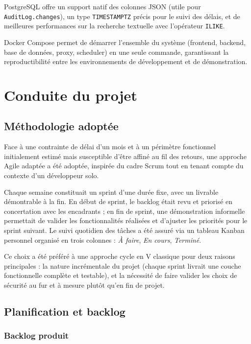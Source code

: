 PostgreSQL offre un support natif des colonnes JSON (utile pour \texttt{AuditLog.changes}), un type \texttt{TIMESTAMPTZ} précis pour le suivi des délais, et de meilleures performances sur la recherche textuelle avec l'opérateur \texttt{ILIKE}.

Docker Compose permet de démarrer l'ensemble du système (frontend, backend, base de données, proxy, scheduler) en une seule commande, garantissant la reproductibilité entre les environnements de développement et de démonstration.

\section{Conduite du projet}

\subsection{Méthodologie adoptée}

Face à une contrainte de délai d'un mois et à un périmètre fonctionnel initialement estimé mais susceptible d'être affiné au fil des retours, une approche Agile adaptée a été adoptée, inspirée du cadre Scrum tout en tenant compte du contexte d'un développeur solo.

Chaque semaine constituait un sprint d'une durée fixe, avec un livrable démontrable à la fin. En début de sprint, le backlog était revu et priorisé en concertation avec les encadrants ; en fin de sprint, une démonstration informelle permettait de valider les fonctionnalités réalisées et d'ajuster les priorités pour le sprint suivant. Le suivi quotidien des tâches a été assuré via un tableau Kanban personnel organisé en trois colonnes : \textit{À faire}, \textit{En cours}, \textit{Terminé}.

Ce choix a été préféré à une approche cycle en V classique pour deux raisons principales : la nature incrémentale du projet (chaque sprint livrait une couche fonctionnelle complète et testable), et la nécessité de faire valider les choix de sécurité au fur et à mesure plutôt qu'en fin de projet.

\subsection{Planification et backlog}

\subsubsection{Backlog produit}

